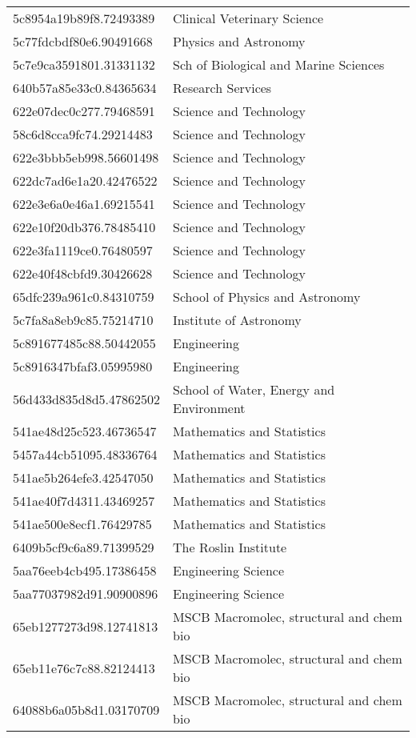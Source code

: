 \begin{tabular}{ll}
5c8954a19b89f8.72493389 & Clinical Veterinary Science \\
5c77fdcbdf80e6.90491668 & Physics and Astronomy \\
5c7e9ca3591801.31331132 & Sch of Biological and Marine Sciences \\
640b57a85e33c0.84365634 & Research Services \\
622e07dec0c277.79468591 & Science and Technology \\
58c6d8cca9fc74.29214483 & Science and Technology \\
622e3bbb5eb998.56601498 & Science and Technology \\
622dc7ad6e1a20.42476522 & Science and Technology \\
622e3e6a0e46a1.69215541 & Science and Technology \\
622e10f20db376.78485410 & Science and Technology \\
622e3fa1119ce0.76480597 & Science and Technology \\
622e40f48cbfd9.30426628 & Science and Technology \\
65dfc239a961c0.84310759 & School of Physics and Astronomy \\
5c7fa8a8eb9c85.75214710 & Institute of Astronomy \\
5c891677485c88.50442055 & Engineering \\
5c8916347bfaf3.05995980 & Engineering \\
56d433d835d8d5.47862502 & School of Water, Energy and Environment \\
541ae48d25c523.46736547 & Mathematics and Statistics \\
5457a44cb51095.48336764 & Mathematics and Statistics \\
541ae5b264efe3.42547050 & Mathematics and Statistics \\
541ae40f7d4311.43469257 & Mathematics and Statistics \\
541ae500e8ecf1.76429785 & Mathematics and Statistics \\
6409b5cf9c6a89.71399529 & The Roslin Institute \\
5aa76eeb4cb495.17386458 & Engineering Science \\
5aa77037982d91.90900896 & Engineering Science \\
65eb1277273d98.12741813 & MSCB Macromolec, structural and chem bio \\
65eb11e76c7c88.82124413 & MSCB Macromolec, structural and chem bio \\
64088b6a05b8d1.03170709 & MSCB Macromolec, structural and chem bio \\

\end{tabular}
